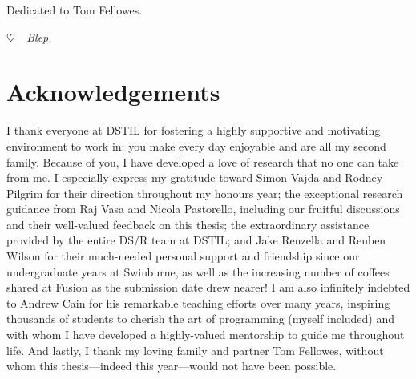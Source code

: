 \cleardoublepage
\pagestyle{empty}
\begin{center}
  \vspace*{0.3\paperheight}
  Dedicated to Tom Fellowes.
  
  {\color{white} \itshape $\heartsuit$~~Blep.}
\end{center}
\pagestyle{fancy}

\chapter*{Acknowledgements}

I thank everyone at DSTIL for fostering a highly supportive and motivating environment to work in: you make every day enjoyable and are all my second family. Because of you, I have developed a love of research that no one can take from me. I especially express my gratitude toward Simon Vajda and Rodney Pilgrim for their direction throughout my honours year; the exceptional research guidance from Raj Vasa and Nicola Pastorello, including our fruitful discussions and their well-valued feedback on this thesis; the extraordinary assistance provided by the entire DS/R team at DSTIL; and Jake Renzella and Reuben Wilson for their much-needed personal support and friendship since our undergraduate years at Swinburne, as well as the increasing number of coffees shared at Fusion as the submission date drew nearer! I am also infinitely indebted to Andrew Cain for his remarkable teaching efforts over many years, inspiring thousands of students to cherish the art of programming (myself included) and with whom I have developed a highly-valued mentorship to guide me throughout life. And lastly, I thank my loving family and partner Tom Fellowes, without whom this thesis---indeed this year---would not have been possible.